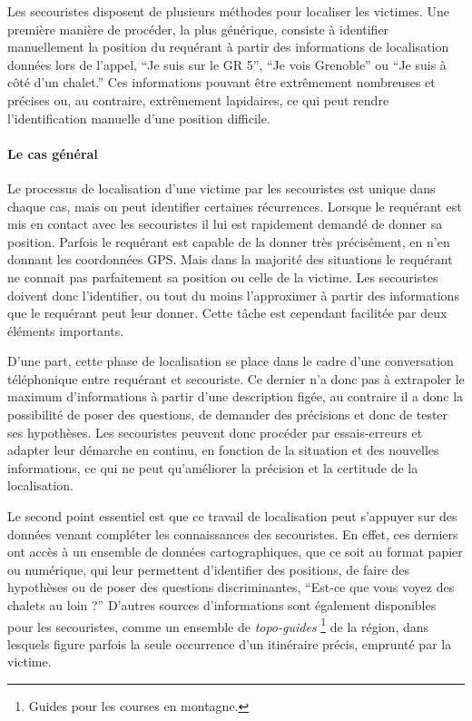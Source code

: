 Les secouristes disposent de plusieurs méthodes pour localiser les
victimes. Une première manière de procéder, la plus générique,
consiste à identifier manuellement la position du requérant à partir
des informations de localisation données lors de l'appel, \eg
\enquote{Je suis sur le GR 5}, \enquote{Je vois Grenoble} ou
\enquote{Je suis à côté d'un chalet.} Ces informations pouvant être
extrêmement nombreuses et précises ou, au contraire, extrêmement
lapidaires, ce qui peut rendre l'identification manuelle d'une
position difficile.

\paragraph{Le cas général}

Le processus de localisation d'une victime par les secouristes est
unique dans chaque cas, mais on peut identifier certaines
récurrences. Lorsque le requérant est mis en contact avec les
secouristes il lui est rapidement demandé de donner sa
position. Parfois le requérant est capable de la donner très
précisément, \eg en n'en donnant les coordonnées GPS. Mais dans la
majorité des situations le requérant ne connait pas parfaitement sa
position ou celle de la victime. Les secouristes doivent donc
l'identifier, ou tout du moins l'approximer à partir des informations
que le requérant peut leur donner. Cette tâche est cependant facilitée
par deux éléments importants.

D'une part, cette phase de localisation se place dans le cadre d'une
conversation téléphonique entre requérant et secouriste. Ce dernier
n'a donc pas à extrapoler le maximum d'informations à partir d'une
description figée, au contraire il a donc la possibilité de poser des
questions, de demander des précisions et donc de tester ses
hypothèses. Les secouristes peuvent donc procéder par essais-erreurs
et adapter leur démarche en continu, en fonction de la situation et
des nouvelles informations, ce qui ne peut qu'améliorer la précision
et la certitude de la localisation.

Le second point essentiel est que ce travail de localisation peut
s'appuyer sur des données venant compléter les connaissances des
secouristes. En effet, ces derniers ont accès à un ensemble de données
cartographiques, que ce soit au format papier ou numérique, qui leur
permettent d'identifier des positions, de faire des hypothèses ou de
poser des questions discriminantes, \eg \enquote{Est-ce que vous voyez
  des chalets au loin ?} D'autres sources d'informations sont
également disponibles pour les secouristes, comme un ensemble de
\emph{topo-guides} \footnote{Guides pour les courses en montagne.} de
la région, dans lesquels figure parfois la seule occurrence d'un
itinéraire précis, emprunté par la victime. 

